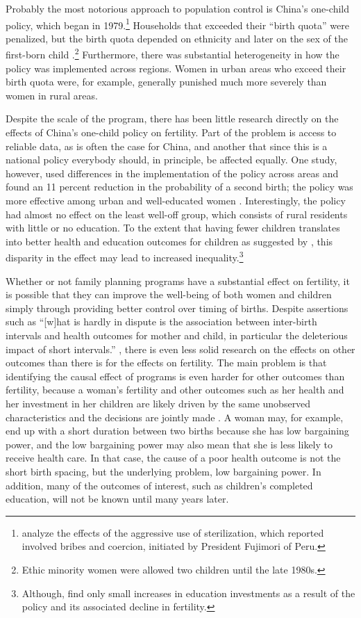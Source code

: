Probably the most notorious approach to population control is China's one-child policy, which began in 1979.\footnote{\citet{Byker2012} analyze the effects of the aggressive use of sterilization, which reported involved bribes and coercion, initiated by President Fujimori of Peru.} Households that exceeded their ``birth quota'' were penalized, but the birth quota depended on ethnicity and later on the sex of the first-born child \citep{Li2005}.\footnote{Ethic minority women were allowed two children until the late 1980s.} Furthermore, there was substantial heterogeneity in how the policy was implemented across regions. Women in urban areas who exceed their birth quota were, for example, generally punished much more severely than women in rural areas.

Despite the scale of the program, there has been little research directly on the effects of China's one-child policy on fertility. Part of the problem is access to reliable data, as is often the case for China, and another that since this is a national policy everybody should, in principle, be affected equally. One study, however, used differences in the implementation of the policy across areas and found an 11 percent reduction in the probability of a second birth; the policy was more effective among urban and well-educated women \citep{Li2005}. Interestingly, the policy had almost no eﬀect on the least well-oﬀ group, which consists of rural residents with little or no education. To the extent that having fewer children translates into better health and education outcomes for children as suggested by \citet{becker73}, this disparity in the effect may lead to increased inequality.\footnote{Although, \citet{Rosenzweig2009} find only small increases in education investments as a result of the policy and its associated decline in fertility.}

Whether or not family planning programs have a substantial effect on fertility, it is possible that they can improve the well-being of both women and children simply through providing better control over timing of births. Despite assertions such as ``{[}w{]}hat is hardly in dispute is the association between inter-birth intervals and health outcomes for mother and child, in particular the deleterious impact of short intervals.'' \citep[p. 175]{Casterline2016}, there is even less solid research on the effects on other outcomes than there is for the effects on fertility. The main problem is that identifying the causal effect of programs is even harder for other outcomes than fertility, because a woman's fertility and other outcomes such as her health and her investment in her children are likely driven by the same unobserved characteristics and the decisions are jointly made \citep{Schultz2005}. A woman may, for example, end up with a short duration between two births because she has low bargaining power, and the low bargaining power may also mean that she is less likely to receive health care. In that case, the cause of a poor health outcome is not the short birth spacing, but the underlying problem, low bargaining power. In addition, many of the outcomes of interest, such as children's completed education, will not be known until many years later.

